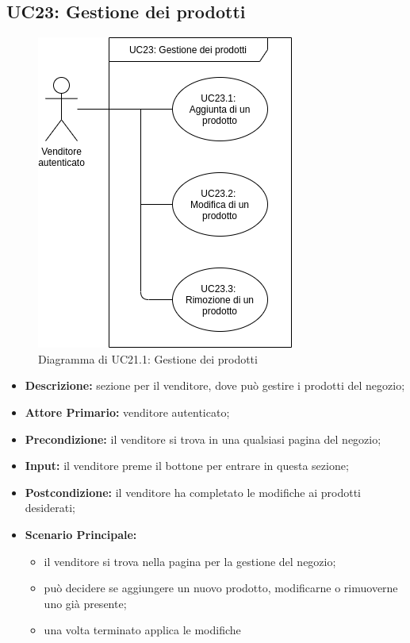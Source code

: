 \subsection{UC23: Gestione dei prodotti}
        \label{sec:UC23}
        \begin{figure}[!ht]
            \caption{Diagramma di UC21.1: Gestione dei prodotti}
            \vspace{10px}
            \includegraphics[scale=0.5]{../../../Images/AnalisiRequisiti/UC23}
            \centering
        \end{figure}
        \begin{itemize}
            \item \textbf{Descrizione:} sezione per il venditore, dove può gestire i prodotti del negozio;
            \item \textbf{Attore Primario:} venditore autenticato;
            \item \textbf{Precondizione:} il venditore si trova in una qualsiasi pagina del negozio;
            \item \textbf{Input:} il venditore preme il bottone per entrare in questa sezione;
            \item \textbf{Postcondizione:} il venditore ha completato le modifiche ai prodotti desiderati;
            \item \textbf{Scenario Principale:} 
                \begin{itemize}
                    \item il venditore si trova nella pagina per la gestione del negozio;
                    \item può decidere se aggiungere un nuovo prodotto, modificarne o rimuoverne uno già presente;
                    \item una volta terminato applica le modifiche
                \end{itemize}
        \end{itemize}
